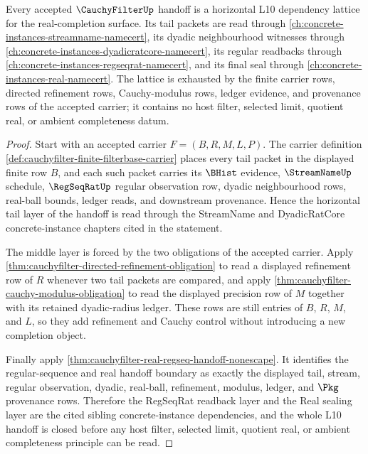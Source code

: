 \begin{theorem}
\label{thm:cauchyfilter-l10-dependency-handoff-lattice}
Every accepted $\CauchyFilterUp$ handoff is a horizontal L10 dependency
lattice for the real-completion surface. Its tail packets are read through
\autoref{ch:concrete-instances-streamname-namecert}, its dyadic neighbourhood
witnesses through \autoref{ch:concrete-instances-dyadicratcore-namecert}, its
regular readbacks through \autoref{ch:concrete-instances-regseqrat-namecert},
and its final seal through \autoref{ch:concrete-instances-real-namecert}. The
lattice is exhausted by the finite carrier rows, directed refinement rows,
Cauchy-modulus rows, ledger evidence, and provenance rows of the accepted
carrier; it contains no host filter, selected limit, quotient real, or ambient
completeness datum.
\end{theorem}
\begin{proof}
Start with an accepted carrier $F=(B,R,M,L,P)$. The carrier definition
\autoref{def:cauchyfilter-finite-filterbase-carrier} places every tail packet
in the displayed finite row $B$, and each such packet carries its
$\BHist$ evidence, $\StreamNameUp$ schedule, $\RegSeqRatUp$ regular
observation row, dyadic neighbourhood rows, real-ball bounds, ledger reads,
and downstream provenance. Hence the horizontal tail layer of the handoff is
read through the StreamName and DyadicRatCore concrete-instance chapters cited
in the statement.

The middle layer is forced by the two obligations of the accepted carrier.
Apply \autoref{thm:cauchyfilter-directed-refinement-obligation} to read a
displayed refinement row of $R$ whenever two tail packets are compared, and
apply \autoref{thm:cauchyfilter-cauchy-modulus-obligation} to read the
displayed precision row of $M$ together with its retained dyadic-radius ledger.
These rows are still entries of $B$, $R$, $M$, and $L$, so they add refinement
and Cauchy control without introducing a new completion object.

Finally apply
\autoref{thm:cauchyfilter-real-regseq-handoff-nonescape}. It identifies the
regular-sequence and real handoff boundary as exactly the displayed tail,
stream, regular observation, dyadic, real-ball, refinement, modulus, ledger,
and $\Pkg$ provenance rows. Therefore the RegSeqRat readback layer and the
Real sealing layer are the cited sibling concrete-instance dependencies, and
the whole L10 handoff is closed before any host filter, selected limit,
quotient real, or ambient completeness principle can be read.
\end{proof}

